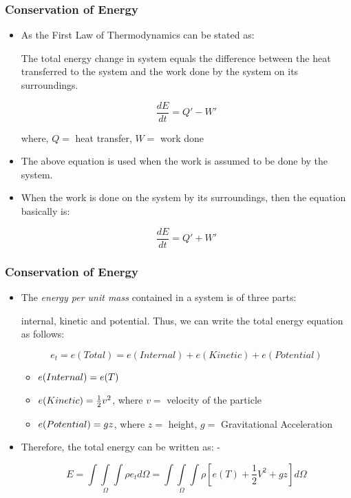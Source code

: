 \documentclass[10pt]{beamer}
\begin{document}
\begin{frame}
    \frametitle{Conservation of Energy}
    \begin{itemize}
        \item As the First Law of Thermodynamics can be stated as:

        The total energy change in system equals the difference between the heat transferred to the system and the work done by the system on its surroundings.

        $$
        \frac {dE} {dt} = Q'-W'
        $$

        where, $Q=$ heat transfer, $W =$  work done

        \item The above equation is used when the work is assumed to be done by the system.

        \item When the work is done on the system by its surroundings, then the equation basically is:

        $$
        \frac {dE} {dt} = Q'+W'
        $$

    \end{itemize}
\end{frame}

\begin{frame}
    \frametitle{Conservation of Energy}
    \begin{itemize}
        \item The \textit{energy per unit mass} contained in a system is of three parts:

        internal, kinetic and potential. Thus, we can write the total energy equation as follows:

        $$
        e_t = e(Total) = e(Internal)+e(Kinetic)+e(Potential)
        $$

            \begin{itemize}
                \item $\space e(Internal) = e(T)$

                \item $\space e(Kinetic) = \frac 1 2 v^2$, where $v =$  velocity of the particle

                \item $\space e(Potential) = gz$, where $z =$  height, $g =$  Gravitational Acceleration
            \end{itemize}

        \item Therefore, the total energy can be written as: -

        $$
        E = \int\int\limits_{\Omega}\int \rho e_t d\Omega = \int\int\limits_{\Omega}\int\rho[e(T)+ \frac 1 2 V^2 + gz]d\Omega
        $$
    \end{itemize}
\end{frame}
\end{document}
